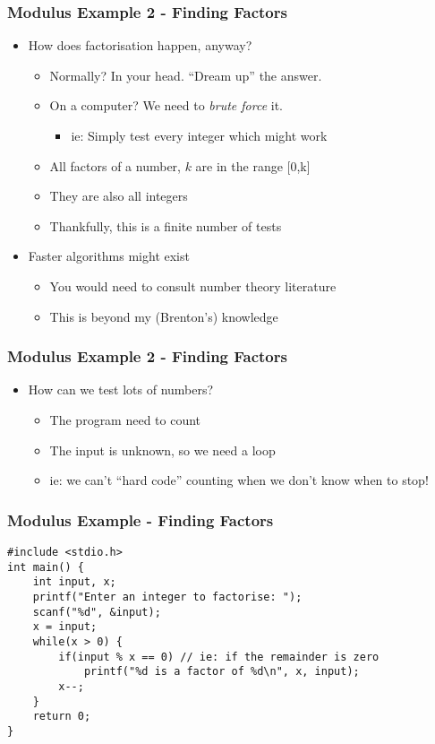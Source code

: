 \documentclass[14pt]{beamer}
\begin{document}
\begin{frame}
\frametitle{Modulus Example 2 - Finding Factors}
\begin{itemize}
\item How does factorisation happen, anyway?
	\begin{itemize}
		\item Normally? In your head. ``Dream up'' the answer.
		\item On a computer? We need to \textit{brute force} it.
			\begin{itemize}
				\item ie: Simply test every integer which might work	
			\end{itemize}
		\item All factors of a number, $k$ are in the range [0,k]
		\item They are also all integers
		\item Thankfully, this is a finite number of tests
	\end{itemize}
\item Faster algorithms might exist
	\begin{itemize}
		\item You would need to consult number theory literature
		\item This is beyond my (Brenton's) knowledge
	\end{itemize}
\end{itemize}
\end{frame}

\begin{frame}
\frametitle{Modulus Example 2 - Finding Factors}
\begin{itemize}
\item How can we test lots of numbers?
	\begin{itemize}
		\item The program need to count
		\item The input is unknown, so we need a loop
		\item ie: we can't ``hard code'' counting when  we don't know when to stop!
	\end{itemize}
\end{itemize}
\end{frame}

\begin{frame}[fragile]
\frametitle{Modulus Example - Finding Factors}

\begin{lstlisting}[style=CStyle,basicstyle=\ttfamily\footnotesize,caption=\texttt{factors.c}]
#include <stdio.h>
int main() {
	int input, x;
	printf("Enter an integer to factorise: ");
	scanf("%d", &input);
	x = input;
	while(x > 0) {
		if(input % x == 0) // ie: if the remainder is zero
			printf("%d is a factor of %d\n", x, input);
		x--;
	}
	return 0;
}
\end{lstlisting}
\end{frame}
\end{document}
